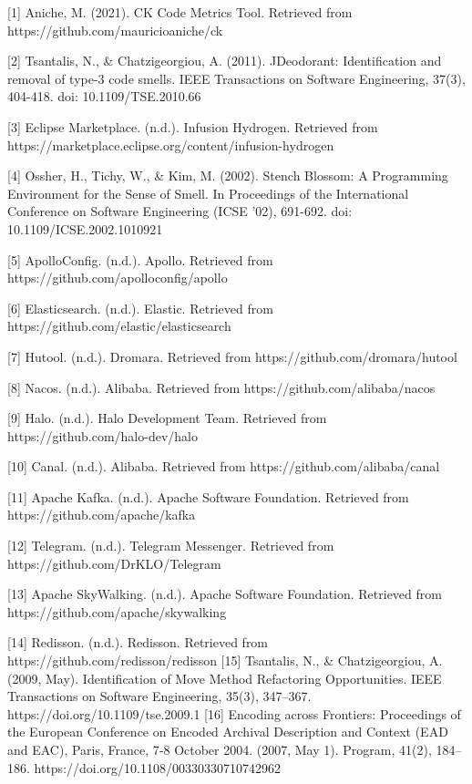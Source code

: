 \documentclass[conference]{IEEEtran}
\begin{document}
	\begin{thebibliography}{00}
		 [1] Aniche, M. (2021). CK Code Metrics Tool. Retrieved from https://github.com/mauricioaniche/ck
		
		 [2] Tsantalis, N., \& Chatzigeorgiou, A. (2011). JDeodorant: Identification and removal of type-3 code smells. IEEE Transactions on Software Engineering, 37(3), 404-418. doi: 10.1109/TSE.2010.66
		
		 [3] Eclipse Marketplace. (n.d.). Infusion Hydrogen. Retrieved from https://marketplace.eclipse.org/content/infusion-hydrogen
		
		 [4] Ossher, H., Tichy, W., \& Kim, M. (2002). Stench Blossom: A Programming Environment for the Sense of Smell. In Proceedings of the International Conference on Software Engineering (ICSE '02), 691-692. doi: 10.1109/ICSE.2002.1010921
		
		 [5] ApolloConfig. (n.d.). Apollo. Retrieved from https://github.com/apolloconfig/apollo
		
		 [6] Elasticsearch. (n.d.). Elastic. Retrieved from https://github.com/elastic/elasticsearch
		
		 [7] Hutool. (n.d.). Dromara. Retrieved from https://github.com/dromara/hutool
		
		 [8] Nacos. (n.d.). Alibaba. Retrieved from https://github.com/alibaba/nacos
		
		 [9] Halo. (n.d.). Halo Development Team. Retrieved from https://github.com/halo-dev/halo
		
		 Canal. (n.d.). Alibaba. Retrieved from https://github.com/alibaba/canal
		
		 Apache Kafka. (n.d.). Apache Software Foundation. Retrieved from https://github.com/apache/kafka
		
		 Telegram. (n.d.). Telegram Messenger. Retrieved from https://github.com/DrKLO/Telegram
		
		 Apache SkyWalking. (n.d.). Apache Software Foundation. Retrieved from https://github.com/apache/skywalking
		
		 Redisson. (n.d.). Redisson. Retrieved from https://github.com/redisson/redisson
		 Tsantalis, N., \& Chatzigeorgiou, A. (2009, May). Identification of Move Method Refactoring Opportunities. IEEE Transactions on Software Engineering, 35(3), 347–367. https://doi.org/10.1109/tse.2009.1
		 Encoding across Frontiers: Proceedings of the European Conference on Encoded Archival Description and Context (EAD and EAC), Paris, France, 7‐8 October 2004. (2007, May 1). Program, 41(2), 184–186. https://doi.org/10.1108/00330330710742962
		
	\end{thebibliography}
\end{document}
